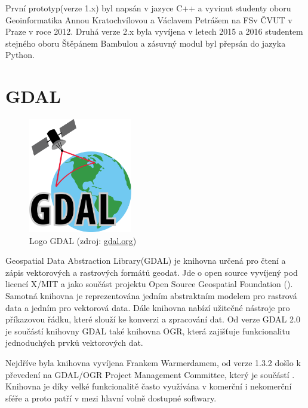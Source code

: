 První prototyp(verze 1.x) byl napsán v jazyce C++ a vyvinut studenty oboru Geoinformatika Annou Kratochvílovou a Václavem Petrášem na FSv ČVUT v Praze v roce 2012. Druhá verze 2.x byla vyvíjena v letech 2015 a 2016 studentem stejného oboru Štěpánem Bambulou a zásuvný modul byl přepsán do jazyka Python. \citep{vfk_qgis_plugin}
 
\section{GDAL}
\label{sec:gdal}
\begin{figure}[H]
	 \centering
      \includegraphics[height=5cm]{./pictures/gdal-logo.png}
      \caption{Logo GDAL (zdroj:
\href{https://upload.wikimedia.org/wikipedia/commons/thumb/d/df/GDALLogoColor.svg/572px-GDALLogoColor.svg.png}{gdal.org})}
      \label{fig:gdal}
  \end{figure}
  
Geospatial Data Abstraction Library(GDAL) je knihovna určená pro čtení a zápis vektorových a rastrových formátů geodat. Jde o open source vyvíjený pod licencí X/MIT a jako součást projektu Open Source Geospatial Foundation (). Samotná knihovna je reprezentována jedním abstraktním modelem pro rastrová data a jedním pro vektorová data. Dále knihovna nabízí užitečné nástroje pro příkazovou řádku, které slouží ke konverzi a zpracování dat. Od verze GDAL 2.0 je součástí knihovny GDAL také knihovna OGR, která zajišťuje funkcionalitu jednoduchých prvků vektorových dat.

Nejdříve byla knihovna vyvíjena Frankem Warmerdamem, od verze 1.3.2 došlo k převedení na GDAL/OGR Project Management Committee, který je součástí . Knihovna je díky velké funkcionalitě často využívána v komerční i nekomerční sféře a proto patří v  mezi hlavní volně dostupné softwary. \cite{gdal, gdal_wiki}

